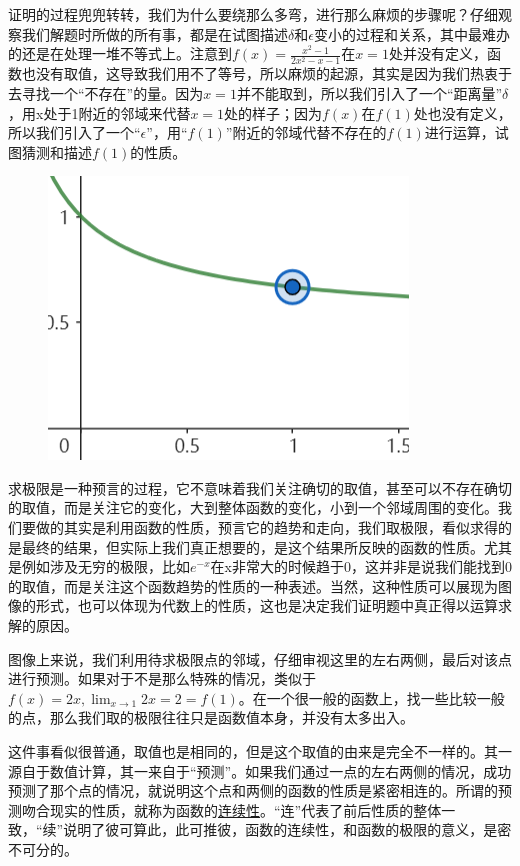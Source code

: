 \documentclass[fontset=none]{ctexart}
\begin{document}
    证明的过程兜兜转转，我们为什么要绕那么多弯，进行那么麻烦的步骤呢？仔细观察我们解题时所做的所有事，都是在试图描述$\delta$和$\epsilon$变小的过程和关系，其中最难办的还是在处理一堆不等式上。注意到$f(x)=\frac{x^2-1}{2x^2-x-1}$在$x=1$处并没有定义，函数也没有取值，这导致我们用不了等号，所以麻烦的起源，其实是因为我们热衷于去寻找一个“不存在”的量。因为$x=1$并不能取到，所以我们引入了一个“距离量”$\delta$，用x处于1附近的邻域来代替$x=1$处的样子；因为$f(x)$在$f(1)$处也没有定义，所以我们引入了一个“$\epsilon$”，用“$f(1)$”附近的邻域代替不存在的$f(1)$进行运算，试图猜测和描述$f(1)$的性质。

    \begin{figure}[htbp]
        \centering
        \includegraphics[scale=1]{3.png}
    \end{figure}
    
    求极限是一种预言的过程，它不意味着我们关注确切的取值，甚至可以不存在确切的取值，而是关注它的变化，大到整体函数的变化，小到一个邻域周围的变化。我们要做的其实是利用函数的性质，预言它的趋势和走向，我们取极限，看似求得的是最终的结果，但实际上我们真正想要的，是这个结果所反映的函数的性质。尤其是例如涉及无穷的极限，比如$e^{-x}$在x非常大的时候趋于0，这并非是说我们能找到0的取值，而是关注这个函数趋势的性质的一种表述。当然，这种性质可以展现为图像的形式，也可以体现为代数上的性质，这也是决定我们证明题中真正得以运算求解的原因。

    图像上来说，我们利用待求极限点的邻域，仔细审视这里的左右两侧，最后对该点进行预测。如果对于不是那么特殊的情况，类似于$f(x)=2x,\lim_{x\to1}2x=2=f(1)$。在一个很一般的函数上，找一些比较一般的点，那么我们取的极限往往只是函数值本身，并没有太多出入。
    
    这件事看似很普通，取值也是相同的，但是这个取值的由来是完全不一样的。其一源自于数值计算，其一来自于“预测”。如果我们通过一点的左右两侧的情况，成功预测了那个点的情况，就说明这个点和两侧的函数的性质是紧密相连的。所谓的预测吻合现实的性质，就称为函数的\underline{连续性}。“连”代表了前后性质的整体一致，“续”说明了彼可算此，此可推彼，函数的连续性，和函数的极限的意义，是密不可分的。
\end{document}
